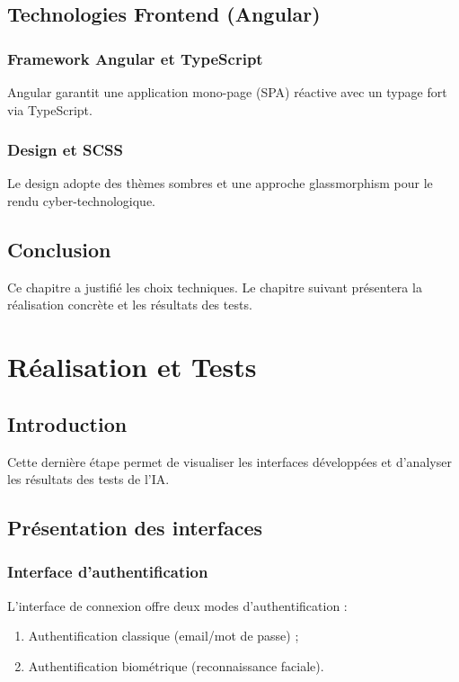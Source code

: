 \documentclass[12pt,a4paper]{report}
\numberwithin{figure}{chapter}
\numberwithin{table}{chapter}
\begin{document}
\section{Technologies Frontend (Angular)}

\subsection{Framework Angular et TypeScript}
Angular garantit une application mono-page (SPA) réactive avec un typage fort via TypeScript.

\subsection{Design et SCSS}
Le design adopte des thèmes sombres et une approche glassmorphism pour le rendu cyber-technologique.

\section{Conclusion}
Ce chapitre a justifié les choix techniques. Le chapitre suivant présentera la réalisation concrète
et les résultats des tests.

\chapter{Réalisation et Tests}

\section{Introduction}
Cette dernière étape permet de visualiser les interfaces développées et d'analyser les résultats
des tests de l'IA.

\section{Présentation des interfaces}

\subsection{Interface d'authentification}
L'interface de connexion offre deux modes d'authentification :
\begin{enumerate}
  \item Authentification classique (email/mot de passe) ;
  \item Authentification biométrique (reconnaissance faciale).
\end{enumerate}
\end{document}
